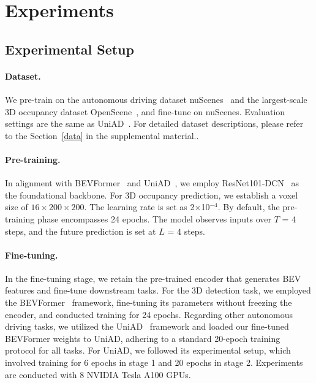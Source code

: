 \section{Experiments}

\subsection{Experimental Setup}

\paragraph{Dataset.}  
We pre-train on the autonomous driving dataset nuScenes~\cite{nuscenes} and the largest-scale 3D occupancy dataset OpenScene~\cite{openscene}, and fine-tune on nuScenes. Evaluation settings are the same as UniAD~\cite{uniad}. For detailed dataset descriptions, please refer to the Section~\ref{data} in the supplemental material..
\paragraph{Pre-training.}
In alignment with BEVFormer~\cite{bevformer} and UniAD~\cite{uniad}, we employ ResNet101-DCN~\cite{resnet} as the foundational backbone. For 3D occupancy prediction, we establish a voxel size of $16\times200\times200$. The learning rate is set as 2$\times$10$^{-4}$. By default, the pre-training phase encompasses 24 epochs. The model observes inputs over $T$ = 4 steps, and the future prediction is set at $L$ = 4 steps.

\paragraph{Fine-tuning.}
In the fine-tuning stage, we retain the pre-trained encoder that generates BEV features and fine-tune downstream tasks. For the 3D detection task, we employed the BEVFormer~\cite{bevformer} framework, fine-tuning its parameters without freezing the encoder, and conducted training for 24 epochs. Regarding other autonomous driving tasks, we utilized the UniAD~\cite{uniad} framework and loaded our fine-tuned BEVFormer weights to UniAD, adhering to a standard 20-epoch training protocol for all tasks. For UniAD, we followed its experimental setup, which involved training for 6 epochs in stage 1 and 20 epochs in stage 2. Experiments are conducted with 8 NVIDIA Tesla A100 GPUs.

